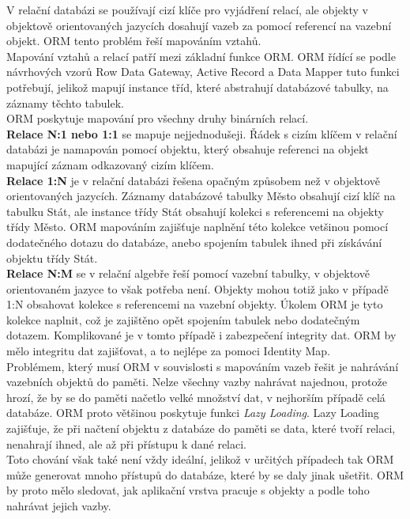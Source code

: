 \documentclass[ing,male,java,dept456]{diploma}						%
\begin{document}
V relační databázi se používají cizí klíče pro vyjádření relací, ale objekty v objektově orientovaných jazycích dosahují vazeb za pomocí referencí na vazební objekt. ORM tento problém řeší mapováním vztahů.\\
Mapování vztahů a relací patří mezi základní funkce ORM. ORM řídící se podle návrhových vzorů Row Data Gateway, Active Record a Data Mapper tuto funkci potřebují, jelikož mapují instance tříd, které abstrahují databázové tabulky, na záznamy těchto tabulek. \\
ORM poskytuje mapování pro všechny druhy binárních relací. \\
\textbf{Relace N:1 nebo 1:1} se mapuje nejjednodušeji. Řádek s cizím klíčem v relační databázi je namapován pomocí objektu, který obsahuje referenci na objekt mapující záznam odkazovaný cizím klíčem. \\
\textbf{Relace 1:N} je v relační databázi řešena opačným způsobem než v objektově orientovaných jazycích. Záznamy databázové tabulky Město obsahují cizí klíč na tabulku Stát, ale instance třídy Stát obsahují kolekci s referencemi na objekty třídy Město. ORM mapováním zajišťuje naplnění této kolekce vetšinou pomocí dodatečného dotazu do databáze, anebo spojením tabulek ihned při získávání objektu třídy Stát. \\
\textbf{Relace N:M} se v relační algebře řeší pomocí vazební tabulky, v objektově orientovaném jazyce to však potřeba není. Objekty mohou totiž jako v případě 1:N obsahovat kolekce s referencemi na vazební objekty. Úkolem ORM je tyto kolekce naplnit, což je zajištěno opět spojením tabulek nebo dodatečným dotazem. Komplikované je v tomto případě i zabezpečení integrity dat. ORM by mělo integritu dat zajišťovat, a to nejlépe za pomoci Identity Map. \\
Problémem, který musí ORM v souvislosti s mapováním vazeb řešit je nahrávání vazebních objektů do paměti. Nelze všechny vazby nahrávat najednou, protože hrozí, že by se do paměti načetlo velké množství dat, v nejhorším případě celá databáze. ORM proto většinou poskytuje funkci \textit{Lazy Loading}. Lazy Loading zajišťuje, že při načtení objektu z databáze do paměti se data, které tvoří relaci, nenahrají ihned, ale až při přístupu k dané relaci. \\
Toto chování však také není vždy ideální, jelikož v určitých případech tak ORM může generovat mnoho přístupů do databáze, které by se daly jinak ušetřit. ORM by proto mělo sledovat, jak aplikační vrstva pracuje s objekty a podle toho nahrávat jejich vazby. 
\end{document}
